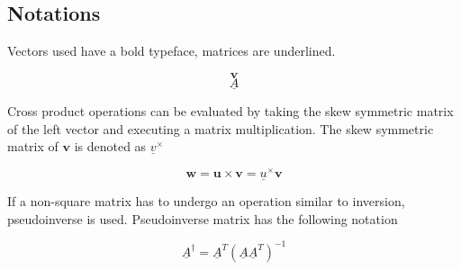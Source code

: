\subsection{Notations}

Vectors used have a bold typeface, matrices are underlined. 

\begin{equation*}
\textbf{v}
\end{equation*}
\begin{equation*}
\underline{A}
\end{equation*}

Cross product operations can be evaluated by taking the skew symmetric matrix of the left vector and executing a matrix multiplication. The skew symmetric matrix of $\textbf{v}$ is denoted as $\underline{v}^\times$

\begin{equation*}
	\textbf{w} = \textbf{u} \times \textbf{v} = \underline{u}^\times \textbf{v}
\end{equation*}

If a non-square matrix has to undergo an operation similar to inversion, pseudoinverse is used. Pseudoinverse matrix has the following notation

\begin{equation}
 \underline{A}^\dagger    =  \underline{A}^T  (\underline{A} \underline{A}^T)^{-1}
\end{equation}